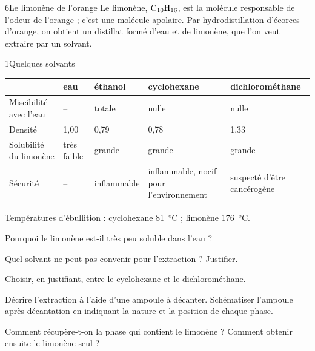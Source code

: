 \begin{exoBac}{6}{Le limonène de l'orange}
Le limonène, $\ce{C10H16}$, est la molécule responsable de l'odeur de l'orange ; c'est une molécule apolaire. Par hydrodistillation
d'écorces d'orange, on obtient un distillat formé d'eau et de limonène, que l'on veut extraire par un solvant.
\begin{docu}{1}{Quelques solvants}
{\small\begin{tabularx}{\linewidth}{@{}lYYYY@{}}\toprule
 & eau & éthanol & cyclohexane & dichlorométhane \\\midrule
Miscibilité avec l'eau & -- & totale & nulle & nulle \\
Densité & 1,00 & 0,79 & 0,78 & 1,33 \\
Solubilité du limonène & très faible & grande & grande & grande \\
Sécurité & -- & inflammable & inflammable, nocif pour l'environnement & suspecté d'être cancérogène \\\bottomrule
\end{tabularx}}
\end{docu}
\begin{donnees}
Températures d'ébullition : cyclohexane \qty{81}{\degreeCelsius} ; limonène \qty{176}{\degreeCelsius}.
\end{donnees}
\begin{questions}
\item Pourquoi le limonène est-il très peu soluble dans l'eau ?
\item Quel solvant ne peut pas convenir pour l'extraction ? Justifier.
\item Choisir, en justifiant, entre le cyclohexane et le dichlorométhane.
\item Décrire l'extraction à l'aide d'une ampoule à décanter. Schématiser l'ampoule après décantation en indiquant la nature et la
position de chaque phase.
\item Comment récupère-t-on la phase qui contient le limonène ? Comment obtenir ensuite le limonène seul ?
\end{questions}
\end{exoBac}

